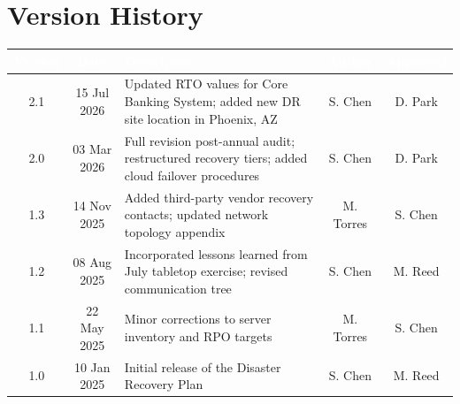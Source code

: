 \section{Version History}

\begin{tcolorbox}[colback=lightgray, colframe=primary, boxrule=0.5pt, arc=3pt, left=10pt, right=10pt, top=8pt, bottom=8pt]
\begin{tabularx}{\textwidth}{@{}c c X c c@{}}
  \toprule
  \rowcolor{tablehead}
  \textcolor{white}{\textbf{Version}} & \textcolor{white}{\textbf{Date}} & \textcolor{white}{\textbf{Description}} & \textcolor{white}{\textbf{Author}} & \textcolor{white}{\textbf{Approved}}\\
  \midrule
  \rowcolor{tablerow}
  2.1 & 15 Jul 2026 & Updated RTO values for Core Banking System; added new DR site location in Phoenix, AZ & S. Chen & D. Park\\
  2.0 & 03 Mar 2026 & Full revision post-annual audit; restructured recovery tiers; added cloud failover procedures & S. Chen & D. Park\\
  \rowcolor{tablerow}
  1.3 & 14 Nov 2025 & Added third-party vendor recovery contacts; updated network topology appendix & M. Torres & S. Chen\\
  1.2 & 08 Aug 2025 & Incorporated lessons learned from July tabletop exercise; revised communication tree & S. Chen & M. Reed\\
  \rowcolor{tablerow}
  1.1 & 22 May 2025 & Minor corrections to server inventory and RPO targets & M. Torres & S. Chen\\
  1.0 & 10 Jan 2025 & Initial release of the Disaster Recovery Plan & S. Chen & M. Reed\\
  \bottomrule
\end{tabularx}
\end{tcolorbox}
